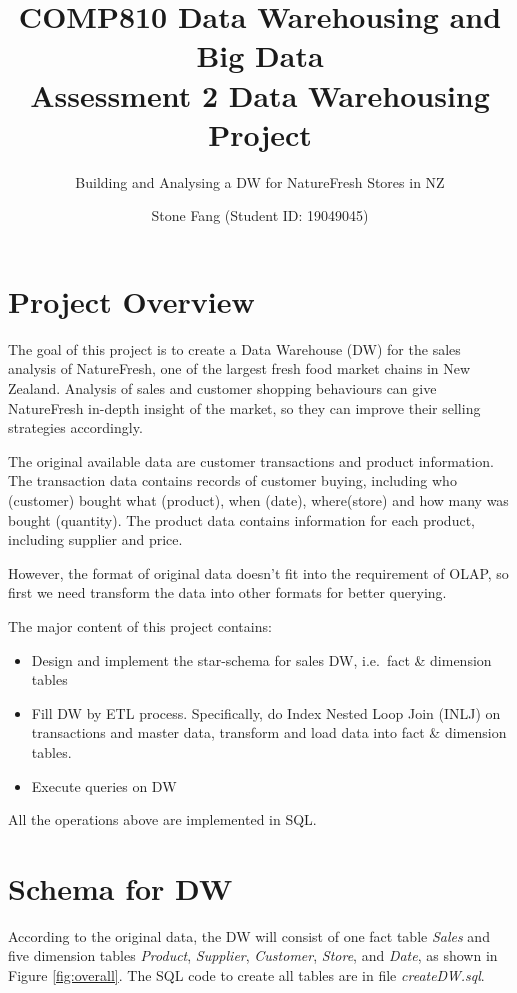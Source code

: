 \documentclass[
  a4paper,
]{article}
\title{COMP810 Data Warehousing and Big Data\\
Assessment 2 Data Warehousing Project}
\subtitle{Building and Analysing a DW for NatureFresh Stores in NZ}
\author{Stone Fang (Student ID: 19049045)}
\date{}
\providecommand{\tightlist}{%
  \setlength{\itemsep}{0pt}\setlength{\parskip}{0pt}}
\begin{document}
\maketitle

\hypertarget{project-overview}{%
\section{Project Overview}\label{project-overview}}

The goal of this project is to create a Data Warehouse (DW) for the
sales analysis of NatureFresh, one of the largest fresh food market
chains in New Zealand. Analysis of sales and customer shopping
behaviours can give NatureFresh in-depth insight of the market, so they
can improve their selling strategies accordingly.

The original available data are customer transactions and product
information. The transaction data contains records of customer buying,
including who (customer) bought what (product), when (date),
where(store) and how many was bought (quantity). The product data
contains information for each product, including supplier and price.

However, the format of original data doesn't fit into the requirement of
OLAP, so first we need transform the data into other formats for better
querying.

The major content of this project contains:

\begin{itemize}
\tightlist
\item
  Design and implement the star-schema for sales DW, i.e.~fact \&
  dimension tables
\item
  Fill DW by ETL process. Specifically, do Index Nested Loop Join (INLJ)
  on transactions and master data, transform and load data into fact \&
  dimension tables.
\item
  Execute queries on DW
\end{itemize}

All the operations above are implemented in SQL.

\hypertarget{schema-for-dw}{%
\section{Schema for DW}\label{schema-for-dw}}

According to the original data, the DW will consist of one fact table
\emph{Sales} and five dimension tables \emph{Product}, \emph{Supplier},
\emph{Customer}, \emph{Store}, and \emph{Date}, as shown in Figure
\ref{fig:overall}. The SQL code to create all tables are in file
\emph{createDW.sql}.
\end{document}
